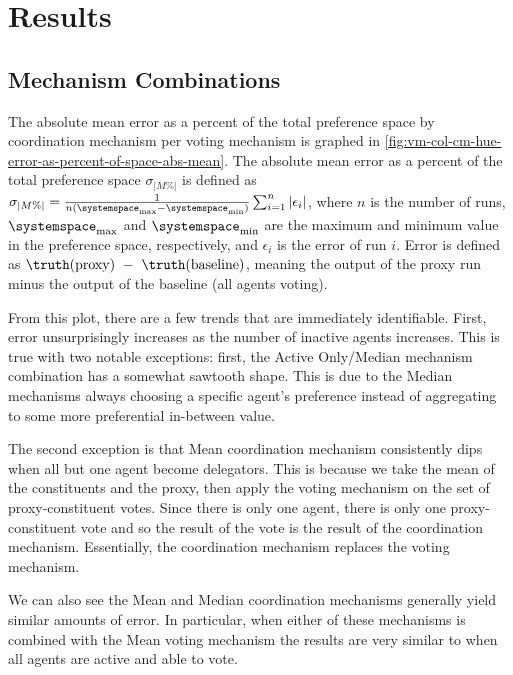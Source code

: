\section{Results}\label{sec:results}

\subsection{Mechanism Combinations}\label{subsec:mechanism-combinations}
The absolute mean error as a percent of the total preference space by coordination
mechanism per voting mechanism is graphed in
\autoref{fig:vm-col-cm-hue-error-as-percent-of-space-abs-mean}.
The absolute mean error as a percent of the total preference space
$\sigma_{\lvert M\% \rvert}$  is defined as
$
    \sigma_{\lvert M\% \rvert} =
    \frac{1}{n (\systemspace_{\max} - \systemspace_{\min})}
        \sum^{n}_{i = 1}{\lvert \epsilon_i  \rvert}
$,
where $n$ is the number of runs, $\systemspace_{\max}$ and $\systemspace_{\min}$ are
the maximum and minimum value in the preference space, respectively, and $\epsilon_i$
is the error of run $i$.
Error is defined as $\truthof{\text{proxy}}~-~\truthof{\text{baseline}}$, meaning the
output of the proxy run minus the output of the baseline (all agents voting).

From this plot, there are a few trends that are immediately identifiable.
First, error unsurprisingly increases as the number of inactive agents increases.
This is true with two notable exceptions: first, the Active Only/Median
mechanism combination has a somewhat sawtooth shape.
This is due to the Median mechanisms always choosing a specific agent's preference
instead of aggregating to some more preferential in-between value.

The second exception is that Mean coordination mechanism consistently dips when all but
one agent become delegators.
This is because we take the mean of the constituents and the proxy, then apply the
voting mechanism on the set of proxy-constituent votes.
Since there is only one agent, there is only one proxy-constituent vote and so the
result of the vote is the result of the coordination mechanism.
Essentially, the coordination mechanism replaces the voting mechanism.

We can also see the Mean and Median coordination mechanisms generally yield similar
amounts of error.
In particular, when either of these mechanisms is combined with the Mean voting
mechanism the results are very similar to when all agents are active and able to vote.

